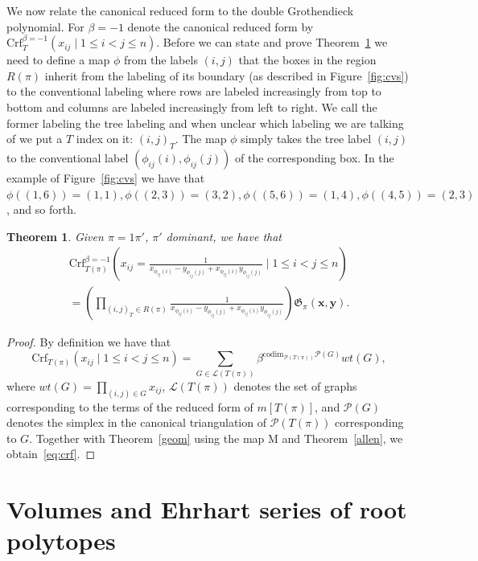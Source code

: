\documentclass[10pt]{amsart}
\newtheorem{theo}{Theorem}[section]
\theoremstyle{definition}
\numberwithin{equation}{section}
\newcommand*{\Crf}{\mathrm{Crf}}
\renewcommand*\P{{\mathcal{P}}}
\newcommand*\+{\smash{\lower2pt\hbox{\rlap{\vrule height14pt}}\raise2pt\hbox{\rlap{\hskip-3pt \vrule height.4pt depth0pt width14.7pt}}}}
\begin{document}
We now relate the canonical reduced form to the double Grothendieck polynomial. For $\beta=-1$ denote the canonical reduced form by $\Crf^{\beta=-1}_T(x_{ij} \mid 1\leq i<j\leq n)$. Before we can state and prove Theorem~\ref{thm:gen} we need to define a map $\phi$ from the labels $(i,j)$ that the boxes in the region $R(\pi)$ inherit from the labeling of its boundary (as described in Figure~\ref{fig:cvs}) to the conventional labeling where rows are labeled increasingly from top to bottom and columns are labeled increasingly from left to right. We call the former labeling the tree labeling and when unclear which labeling we are talking of we put a $T$ index on it: $(i,j)_T$. The map $\phi$ simply takes the tree label $(i,j)$ to the conventional label $(\phi_{ij}(i), \phi_{ij}(j))$ of the corresponding box. In the example of Figure~\ref{fig:cvs} we have that $\phi((1,6))=(1,1), \phi((2,3))=(3,2), \phi((5,6))=(1,4), \phi((4,5))=(2,3)$, and so forth.

\begin{theo}\label{thm:gen}
Given $\pi=1\pi'$, $\pi'$ dominant, we have that
\begin{multline}\label{eq:crf}
\Crf^{\beta=-1}_{T(\pi)}\left(x_{ij}=\frac{1}{x_{\phi_{ij}(i)}-y_{\phi_{ij}(j)}+x_{\phi_{ij}(i)}y_{\phi_{ij}(j)}} \mid 1\leq i<j\leq n\right)
\\=\left(\prod_{(i,j)_T \in R(\pi)} \frac{1}{x_{\phi_{ij}(i)}-y_{\phi_{ij}(j)}+x_{\phi_{ij}(i)}y_{\phi_{ij}(j)}}\right) \mathfrak{G}_{\pi}(\mathbf{x, y}).
\end{multline}
\end{theo}

\begin{proof}
By definition we have that
\begin{equation}
\Crf_{T(\pi)}(x_{ij} \mid 1\leq i<j\leq n)=\sum_{G \in {\mathcal{L}}(T(\pi))}\beta^{\mathrm{codim}_{\P(T(\pi))}\P(G)} wt(G),
\end{equation}
where $wt(G)=\prod_{(i,j)\in G}x_{ij}$, ${\mathcal{L}}(T(\pi))$ denotes the set of graphs corresponding to the terms of the reduced form of $m[T(\pi)]$, and $\P(G)$ denotes the simplex in the canonical triangulation of $\P(T(\pi))$ corresponding to $G$. Together with Theorem~\ref{geom} using the map M and Theorem~\ref{allen}, we obtain~\eqref{eq:crf}.
\end{proof}


\section{Volumes and Ehrhart series of root polytopes}\label{sec:cor}
\end{document}
